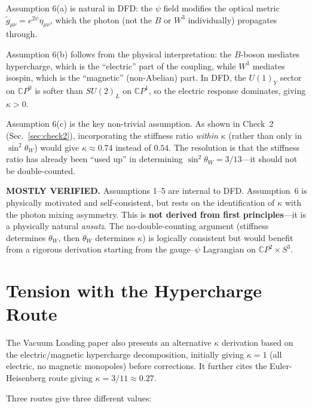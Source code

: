 \documentclass[aps,prd,twocolumn,superscriptaddress,nofootinbib]{revtex4-2}
\newcommand{\CP}{\mathbb{C}P}
\begin{document}
Assumption 6(a) is natural in DFD: the $\psi$ field modifies the
optical metric $\tilde{g}_{\mu\nu} = e^{2\psi}\eta_{\mu\nu}$, which
the photon (not the $B$ or $W^3$ individually) propagates through.

Assumption 6(b) follows from the physical interpretation: the $B$-boson
mediates hypercharge, which is the ``electric'' part of the coupling,
while $W^3$ mediates isospin, which is the ``magnetic'' (non-Abelian)
part.  In DFD, the $U(1)_Y$ sector on $\CP^0$ is softer than $SU(2)_L$
on $\CP^1$, so the electric response dominates, giving $\kappa > 0$.

Assumption 6(c) is the key non-trivial assumption.  As shown in
Check~2 (Sec.~\ref{sec:check2}), incorporating the stiffness ratio
\emph{within} $\kappa$ (rather than only in $\sin^2\theta_W$) would
give $\kappa \approx 0.74$ instead of $0.54$.  The resolution is
that the stiffness ratio has already been ``used up'' in determining
$\sin^2\theta_W = 3/13$---it should not be double-counted.

\begin{tcolorbox}[colback=yellow!5!white, colframe=yellow!60!black, title=Verdict: Check 5]
\textbf{MOSTLY VERIFIED.}  Assumptions 1--5 are internal to DFD.
Assumption~6 is physically motivated and self-consistent, but rests
on the identification of $\kappa$ with the photon mixing asymmetry.
This is \textbf{not derived from first principles}---it is a
physically natural \emph{ansatz}.  The no-double-counting argument
(stiffness determines $\theta_W$, then $\theta_W$ determines $\kappa$)
is logically consistent but would benefit from a rigorous derivation
starting from the gauge--$\psi$ Lagrangian on $\CP^2 \times S^3$.
\end{tcolorbox}


\section{Tension with the Hypercharge Route}
\label{sec:tension}

The Vacuum Loading paper also presents an alternative $\kappa$
derivation based on the electric/magnetic hypercharge decomposition,
initially giving $\kappa = 1$ (all electric, no magnetic monopoles)
before corrections.  It further cites the Euler-Heisenberg route
giving $\kappa = 3/11 \approx 0.27$.

Three routes give three different values:
\end{document}
